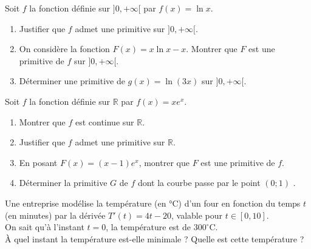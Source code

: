 \begin{exercice}
Soit $f$ la fonction définie sur $]0,+\infty[$ par $f(x) = \ln x$.

\begin{enumerate}
  \item Justifier que $f$ admet une primitive sur $]0,+\infty[$.
  \item On considère la fonction $F(x) = x\ln x-x$. Montrer que $F$ est une primitive de $f$ sur $]0,+\infty[$.
  \item Déterminer une primitive de $g(x) = \ln (3x)$ sur $]0,+\infty[$.
\end{enumerate}
\end{exercice}

\begin{exercice}
Soit $f$ la fonction définie sur $\mathbb{R}$ par $f(x) = xe^x$.

\begin{enumerate}
  \item Montrer que $f$ est continue sur $\mathbb{R}$.
  \item Justifier que $f$ admet une primitive sur $\mathbb{R}$.
  \item En posant $F(x) = (x - 1)e^x$, montrer que $F$ est une primitive de $f$.
  \item Déterminer la primitive $G$ de $f$ dont la courbe passe  par le  point  $(0; 1)$ .
\end{enumerate}
\end{exercice}


\begin{exercice}
Une entreprise modélise la température (en °C) d’un four en fonction du temps $t$ (en minutes) par la dérivée $T'(t) = 4t - 20$, valable pour $t \in [0, 10]$.\\
On sait  qu’à l’instant $t = 0$, la température est de $300^\circ$C.\\
 À quel instant la température est-elle minimale ? Quelle est cette température ?
  
\end{exercice}
